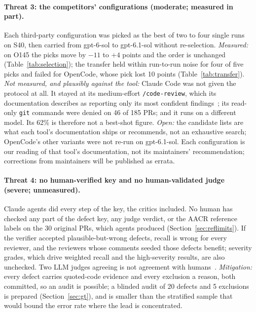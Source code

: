 \documentclass[11pt,a4paper]{article}
\newcommand{\code}[1]{\texttt{#1}}
\begin{document}
\paragraph{Threat 3: the competitors' configurations (moderate; measured in part).}
Each third-party configuration was picked as the best of two to four single
runs on S40, then carried from gpt-6-sol to gpt-6.1-sol without
re-selection. \emph{Measured:} on O145 the picks move by $-11$ to $+4$ points
and the order is unchanged (Table~\ref{tab:selection}); the transfer held
within run-to-run noise for four of five picks and failed for OpenCode, whose
pick lost 10 points (Table~\ref{tab:transfer}). \emph{Not measured, and
plausibly against the tool:} Claude Code was not given the protocol at all.
It stayed at its medium-effort \code{/code-review}, which its documentation
describes as reporting only its most confident findings~\cite{claudecode};
its read-only \code{git} commands were denied on 46 of 185 PRs; and it runs
on a different model. Its 62\% is therefore not a best-shot figure.
\emph{Open:} the candidate lists are what each tool's documentation ships or
recommends, not an exhaustive search; OpenCode's other variants were not
re-run on gpt-6.1-sol. Each configuration is our reading of that tool's
documentation, not its maintainers' recommendation; corrections from
maintainers will be published as errata.

\paragraph{Threat 4: no human-verified key and no human-validated judge (severe; unmeasured).}
Claude agents did every step of the key, the critics included. No human has checked any part of the
defect key, any judge verdict, or the AACR reference labels on the 30
original PRs, which agents produced (Section~\ref{sec:reflimits}). If
the verifier accepted plausible-but-wrong defects, recall is wrong for every
reviewer, and the reviewers whose comments seeded those defects benefit;
severity grades, which drive weighted recall and the high-severity results,
are also unchecked. Two LLM judges agreeing is not agreement with
humans~\cite{bavaresco2025,shankar2024}. \emph{Mitigation:} every defect
carries quoted-code evidence and every exclusion a reason, both committed, so
an audit is possible; a blinded audit of 20 defects and 5 exclusions is
prepared (Section~\ref{sec:gt}), and is smaller than the stratified sample
that would bound the error rate where the lead is concentrated.
\end{document}
